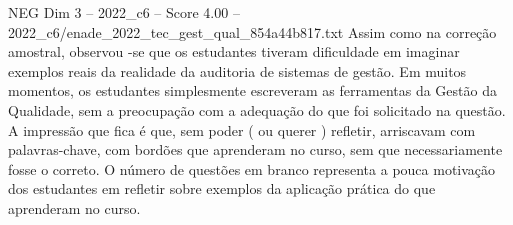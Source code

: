 \begin{textsample}{NEG Dim 3 – 2022\_c6 – Score 4.00 – 2022\_c6/enade\_2022\_tec\_gest\_qual\_854a44b817.txt}
Assim como na correção amostral, observou -se que os estudantes tiveram dificuldade em imaginar exemplos reais da realidade da auditoria de sistemas de gestão.
Em muitos momentos, os estudantes simplesmente escreveram as ferramentas da Gestão da Qualidade, sem a preocupação com a adequação do que foi solicitado na questão.
A impressão que fica é que, sem poder ( ou querer ) refletir, arriscavam com palavras-chave, com bordões que aprenderam no curso, sem que necessariamente fosse o correto.
O número de questões em branco representa a pouca motivação dos estudantes em refletir sobre exemplos da aplicação prática do que aprenderam no curso.

\end{textsample}
